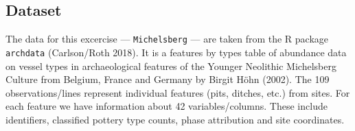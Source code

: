 \documentclass[8pt]{beamer}
\begin{document}
\begin{frame}

\section{Dataset}

The data for this excercise --- \verb|Michelsberg| --- are taken from the R package \verb|archdata| (Carlson/Roth 2018). It is a features by types table of abundance data on vessel types in archaeological features of the Younger Neolithic Michelsberg Culture from Belgium, France and Germany by Birgit Höhn (2002). The 109 observations/lines represent individual features (pits, ditches, etc.) from sites. For each feature we have information about 42 variables/columns. These include identifiers, classified pottery type counts, phase attribution and site coordinates.

\end{frame}
\end{document}
